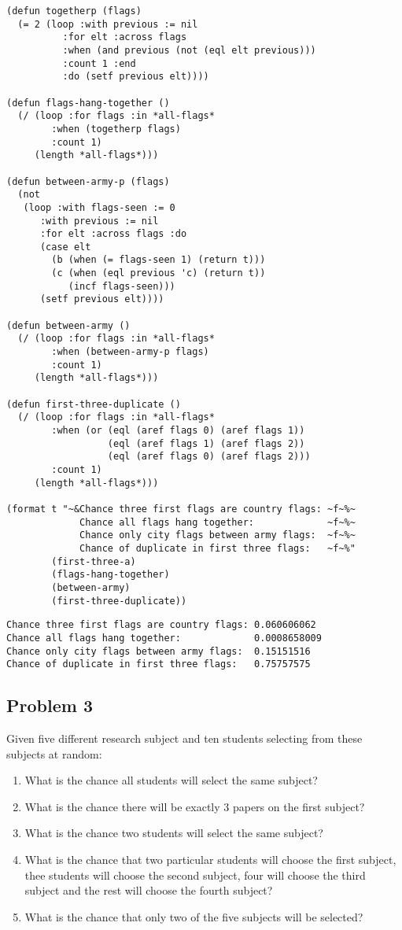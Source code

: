 \documentclass[11pt]{article}
\begin{document}
\begin{lstlisting}
(defun togetherp (flags)
  (= 2 (loop :with previous := nil
          :for elt :across flags
          :when (and previous (not (eql elt previous)))
          :count 1 :end
          :do (setf previous elt))))

(defun flags-hang-together ()
  (/ (loop :for flags :in *all-flags*
        :when (togetherp flags)
        :count 1)
     (length *all-flags*)))

(defun between-army-p (flags)
  (not
   (loop :with flags-seen := 0
      :with previous := nil
      :for elt :across flags :do
      (case elt
        (b (when (= flags-seen 1) (return t)))
        (c (when (eql previous 'c) (return t))
           (incf flags-seen)))
      (setf previous elt))))

(defun between-army ()
  (/ (loop :for flags :in *all-flags*
        :when (between-army-p flags)
        :count 1)
     (length *all-flags*)))

(defun first-three-duplicate ()
  (/ (loop :for flags :in *all-flags*
        :when (or (eql (aref flags 0) (aref flags 1))
                  (eql (aref flags 1) (aref flags 2))
                  (eql (aref flags 0) (aref flags 2)))
        :count 1)
     (length *all-flags*)))

(format t "~&Chance three first flags are country flags: ~f~%~
             Chance all flags hang together:             ~f~%~
             Chance only city flags between army flags:  ~f~%~
             Chance of duplicate in first three flags:   ~f~%"
        (first-three-a)
        (flags-hang-together)
        (between-army)
        (first-three-duplicate))
\end{lstlisting}

\begin{verbatim}
Chance three first flags are country flags: 0.060606062
Chance all flags hang together:             0.0008658009
Chance only city flags between army flags:  0.15151516
Chance of duplicate in first three flags:   0.75757575
\end{verbatim}
\subsection{Problem 3}
\label{sec-1-3}
Given five different research subject and ten students selecting from these
subjects at random:
\begin{enumerate}
\item What is the chance all students will select the same subject?
\item What is the chance there will be exactly 3 papers on the first subject?
\item What is the chance two students will select the same subject?
\item What is the chance that two particular students will choose the first subject,
thee students will choose the second subject, four will choose the third
subject and the rest will choose the fourth subject?
\item What is the chance that only two of the five subjects will be selected?
\end{enumerate}
\end{document}
